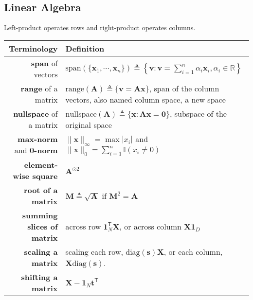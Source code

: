 \subsection{Linear Algebra}




Left-product operates rows and right-product operates columns.

\begin{table}[htpb]
    \centering
    \begin{tabular}{rp{24em}}
        \toprule
        Terminology & Definition \\
        \midrule
        
        \textbf{span} of vectors & $\text{span}(\{\bm{x}_1,\cdots,\bm{x}_n\})\triangleq\left\{\bm{v}:\bm{v}=\sum_{i=1}^n\alpha_i\bm{x}_i,\alpha_i\in\mathbb{R}\right\}$\\
    
        \textbf{range} of a matrix &
        $\text{range}(\mathbf{A})\triangleq\{\bm{v}=\mathbf{A}\bm{x}\}$, span of the column vectors, also named column space, a new space \\
    
        \textbf{nullspace} of a matrix & $\text{nullspace}(\mathbf{A})\triangleq{\{\bm{x}:\mathbf{A}\bm{x}=\bm{0}\}}$, subspace of the original space\\
        
        \textbf{max-norm} and \textbf{0-norm} &
        $\|\bm{x}\|_\infty=\max|x_i|$ and $\|\bm{x}\|_0=\sum_{i=1}^n\mathbb{I}(x_i\neq 0)$\\
        
        \textbf{element-wise square}                    & $\mathbf{A}^{\odot 2}$ \\
        \textbf{root of a matrix}                       & $\mathbf{M}\triangleq\sqrt{\mathbf{A}}$ if $\mathbf{M}^2=\mathbf{A}$ \\
        \textbf{summing slices of matrix}               & across row $\mathbf{1}_N^\mathsf{T}\mathbf{X}$, or across column $\mathbf{X1}_D$ \\
        \textbf{scaling a matrix}                       & scaling each row, $\mathrm{diag}(\bm{s})\mathbf{X}$, or each column, $\mathbf{X}\mathrm{diag}({\bm{s}})$. \\
        \textbf{shifting a matrix}                      & $\mathbf{X}-\mathbf{1}_N\bm{t}^\mathsf{T}$ \\
        

\end{tabular}
\end{table}
